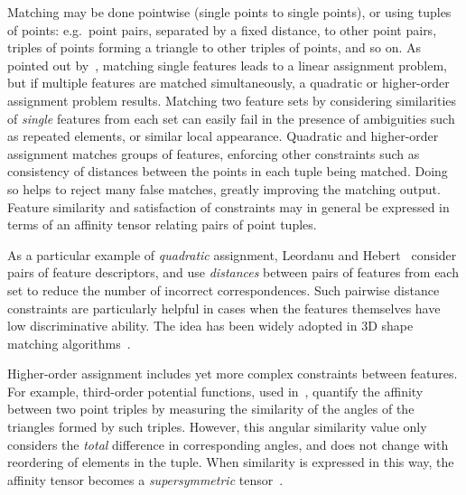 Matching may be done pointwise (single points to single points), or using tuples of points:
e.g.\ point pairs, separated by a fixed distance, to other point pairs,
triples of points forming a triangle to other triples of points, and so on.
As pointed out by~\cite{Conte04}, matching single features leads to
a linear assignment problem, but if multiple features are matched simultaneously,
a quadratic or higher-order assignment problem results.
Matching two feature sets by considering similarities of \emph{single} features from each set can easily fail in the presence of ambiguities such as repeated elements,
or similar local appearance.
Quadratic and higher-order assignment matches groups of features,
enforcing other constraints such as consistency of distances between the points in each tuple being matched.
Doing so helps to reject many false matches, greatly improving the matching output.
Feature similarity and satisfaction of constraints may in general be expressed in terms of an affinity tensor relating pairs of point tuples.

As a particular example of \emph{quadratic} assignment, Leordanu and Hebert~\cite{Leordeanu05} consider pairs of feature descriptors,
and use \emph{distances} between pairs of features from each set to reduce the number of incorrect correspondences.
Such pairwise distance constraints are particularly helpful in cases when the features themselves have low discriminative ability.
The idea has been widely adopted in 3D shape matching algorithms~\cite{Tevs09,Ovsjanikov10,Tevs11,Kim11,SahilliogluY11,Windheuser11}.

Higher-order assignment  includes yet more complex constraints between features.
For example, third-order potential functions, used in~\cite{Duchenne09,Zeng10,Chertok10,Aiping10},
quantify the affinity between two point triples by measuring the similarity of the angles of the triangles formed by such triples.
However, this angular similarity value only considers the \emph{total} difference in corresponding angles, and does not change with reordering of elements in the tuple.
When similarity is expressed in this way, the affinity tensor becomes a \emph{supersymmetric} tensor~\cite{Kofidis02}.

